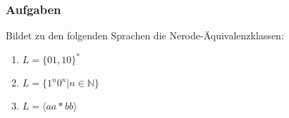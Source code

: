 \begin{frame}
  \frametitle{Aufgaben}
  Bildet zu den folgenden Sprachen die Nerode-Äquivalenzklassen:
  \begin{enumerate}
    \item $L = \{01, 10\}^*$
    \item $L = \{1^n0^n | n \in \mathbb{N}\}$
    \item $L = \langle aa*bb \rangle$
  \end{enumerate}
\end{frame}
